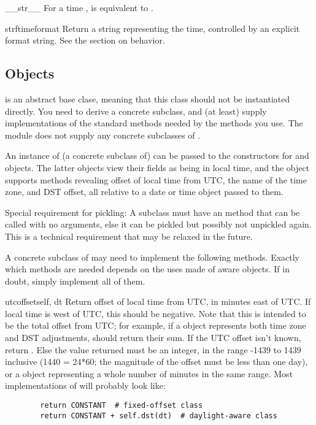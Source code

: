 \begin{methoddesc}{__str__}{}
    For a time ,  is equivalent to
    .
\end{methoddesc}

\begin{methoddesc}{strftime}{format}
    Return a string representing the time, controlled by an explicit
    format string.  See the section on  behavior.
\end{methoddesc}


\subsection{ Objects \label{datetime-tzinfo}}

 is an abstract base clase, meaning that this class
should not be instantiated directly.  You need to derive a concrete
subclass, and (at least) supply implementations of the standard
 methods needed by the  methods you
use.  The  module does not supply any concrete
subclasses of .

An instance of (a concrete subclass of)  can be passed
to the constructors for  and  objects.
The latter objects view their fields as being in local time, and the
 object supports methods revealing offset of local time
from UTC, the name of the time zone, and DST offset, all relative to a
date or time object passed to them.

Special requirement for pickling:  A  subclass must have an
 method that can be called with no arguments, else it
can be pickled but possibly not unpickled again.  This is a technical
requirement that may be relaxed in the future.

A concrete subclass of  may need to implement the
following methods.  Exactly which methods are needed depends on the
uses made of aware  objects.  If in doubt, simply
implement all of them.

\begin{methoddesc}{utcoffset}{self, dt}
    Return offset of local time from UTC, in minutes east of UTC.  If
    local time is west of UTC, this should be negative.  Note that this
    is intended to be the total offset from UTC; for example, if a
     object represents both time zone and DST adjustments,
     should return their sum.  If the UTC offset
    isn't known, return .  Else the value returned must be
    an integer, in the range -1439 to 1439 inclusive (1440 = 24*60;
    the magnitude of the offset must be less than one day), or a
     object representing a whole number of minutes
    in the same range.  Most implementations of 
    will probably look like:
\begin{verbatim}
        return CONSTANT  # fixed-offset class
        return CONSTANT + self.dst(dt)  # daylight-aware class
\end{verbatim}
\end{methoddesc}

